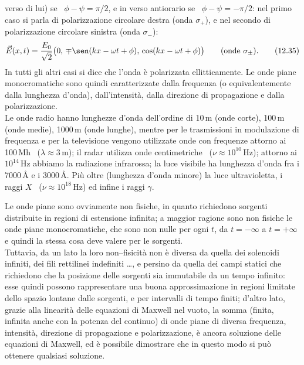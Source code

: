 verso di lui) se \ $\phi-\psi=\pi/2$, e in verso antiorario se
\ $\phi-\psi=-\pi/2$: nel primo caso si parla di polarizzazione circolare destra
(onda $\sigma_+$), e nel secondo di polarizzazione circolare sinistra (onda
$\sigma_-$):
\begin{equation}
  \vec E(x,t)=\frac{E_0}{\sqrt2}\big(0,\,\mp\sen(kx-\omega
  t+\phi),\,\cos(kx-\omega t+\phi)\big)\qquad\text{(onde $\sigma_\pm$)}.
  \tag{12.35}
\end{equation}
In tutti gli altri casi si dice che l'onda \`e polarizzata ellitticamente.
Le onde piane monocromatiche sono quindi caratterizzate dalla frequenza (o
equivalentemente dalla lunghezza d'onda), dall'intensit\`a, dalla direzione di
propagazione e dalla polarizzazione.\\
Le onde radio hanno lunghezze d'onda dell'ordine di 10\,m (onde corte), 100\,m
(onde medie), 1000\,m (onde lunghe), mentre per le trasmissioni in modulazione
di frequenza e per la televisione vengono utilizzate onde con frequenze attorno
ai 100\,Mh \ ($\lambda\approx3$\,m); il radar utilizza onde centimetriche
\ ($\nu\approx10^{10}$\,Hz); attorno ai $10^{14}$\,Hz abbiamo la radiazione
infrarossa; la luce visibile ha lunghezza d'onda fra i 7000\,\AA{} e i
3000\,\AA{}. Pi\`u oltre (lunghezza d'onda minore) la luce ultravioletta, i
raggi $X$ \ ($\nu\approx10^{18}$\,Hz) ed infine i raggi $\gamma$.

Le onde piane sono ovviamente non fisiche, in quanto richiedono sorgenti
distribuite in regioni di estensione infinita; a maggior ragione sono non
fisiche le onde piane monocromatiche, che sono non nulle per ogni $t$, da
$t=-\infty$ a $t=+\infty$ e quindi la stessa cosa deve valere per le sorgenti.\\
Tuttavia, da un lato la loro non--fisicit\`a non \`e diversa da quella dei
solenoidi infiniti, dei fili rettilinei indefiniti \dots, e persino da quella
dei campi statici che richiedono che la posizione delle sorgenti sia immutabile
da un tempo infinito: esse quindi possono rappresentare una buona
approssimazione in regioni limitate dello spazio lontane dalle sorgenti, e per
intervalli di tempo finiti; d'altro lato, grazie alla linearit\`a delle
equazioni di Maxwell nel vuoto, la somma (finita, infinita anche con la potenza
del continuo) di onde piane di diversa frequenza, intensit\`a, direzione di
propagazione e polarizzazione, \`e ancora soluzione delle equazioni di Maxwell,
ed \`e possibile dimostrare che in questo modo si pu\`o ottenere qualsiasi
soluzione.

